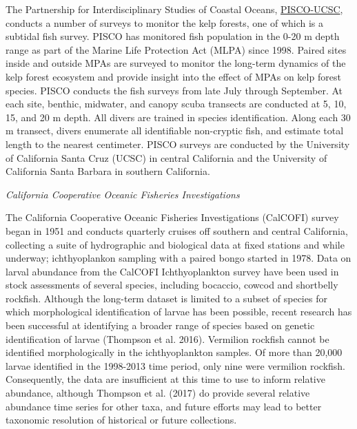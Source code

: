 \documentclass[11pt,
  english,
]{article}
\begin{document}
The Partnership for Interdisciplinary Studies of Coastal Oceans, {\href{http://www.piscoweb.org/kelp-forest-study}{PISCO-UCSC}\leavevmode\tagmcend\tagstructend}, conducts a number of surveys to monitor the kelp forests, one of which is a subtidal fish survey. PISCO has monitored fish population in the 0-20 m depth range as part of the Marine Life Protection Act (MLPA) since 1998. Paired sites inside and outside MPAs are surveyed to monitor the long-term dynamics of the kelp forest ecosystem and provide insight into the effect of MPAs on kelp forest species. PISCO conducts the fish surveys from late July through September. At each site, benthic, midwater, and canopy scuba transects are conducted at 5, 10, 15, and 20 m depth. All divers are trained in species identification. Along each 30 m transect, divers enumerate all identifiable non-cryptic fish, and estimate total length to the nearest centimeter. PISCO surveys are conducted by the University of California Santa Cruz (UCSC) in central California and the University of California Santa Barbara in southern California.

\emph{California Cooperative Oceanic Fisheries Investigations}

The California Cooperative Oceanic Fisheries Investigations (CalCOFI) survey began in 1951 and conducts quarterly cruises off southern and central California, collecting a suite of hydrographic and biological data at fixed stations and while underway; ichthyoplankon sampling with a paired bongo started in 1978. Data on larval abundance from the CalCOFI Ichthyoplankton survey have been used in stock assessments of several species, including bocaccio, cowcod and shortbelly rockfish. Although the long-term dataset is limited to a subset of species for which morphological identification of larvae has been possible, recent research has been successful at identifying a broader range of species based on genetic identification of larvae {(Thompson et al. 2016)\leavevmode\tagmcend\tagstructend}. Vermilion rockfish cannot be identified morphologically in the ichthyoplankton samples. Of more than 20,000 larvae identified in the 1998-2013 time period, only nine were vermilion rockfish. Consequently, the data are insufficient at this time to use to inform relative abundance, although Thompson et al. {(2017)\leavevmode\tagmcend\tagstructend} do provide several relative abundance time series for other taxa, and future efforts may lead to better taxonomic resolution of historical or future collections.
\end{document}
